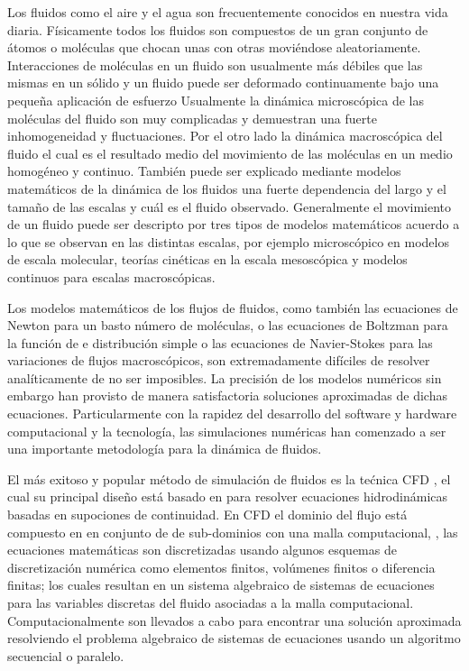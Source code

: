 Los fluidos como el aire y el agua son frecuentemente conocidos en nuestra vida diaria. Físicamente todos los fluidos son compuestos de un gran conjunto de átomos o moléculas que chocan unas con otras moviéndose  aleatoriamente.
Interacciones de moléculas en un fluido son usualmente más débiles que las mismas en un sólido y un fluido puede ser deformado continuamente bajo una pequeña aplicación de esfuerzo
Usualmente la dinámica microscópica de las moléculas del fluido son muy complicadas y demuestran una fuerte inhomogeneidad y fluctuaciones.
Por el otro lado la dinámica macroscópica del fluido el cual es el resultado medio del movimiento de las moléculas en un medio homogéneo y continuo.
También puede ser explicado mediante modelos matemáticos de la dinámica de los fluidos una fuerte dependencia del largo y el tamaño de las escalas y cuál es el fluido observado.
Generalmente el movimiento de un fluido puede ser descripto por tres tipos de modelos matemáticos acuerdo a lo que se observan en las distintas escalas, por ejemplo microscópico en modelos de escala molecular, teorías cinéticas en la escala mesoscópica y modelos continuos para escalas macroscópicas.

Los modelos matemáticos de los flujos de fluidos, como también las ecuaciones de Newton para un basto número de moléculas, o las ecuaciones de Boltzman para la función de e distribución simple o las ecuaciones de Navier-Stokes para las variaciones de flujos macroscópicos, son extremadamente difíciles de resolver analíticamente de no ser imposibles.
La precisión de los modelos numéricos sin embargo han provisto de manera satisfactoria soluciones aproximadas de dichas ecuaciones.
Particularmente con la rapidez del desarrollo del software y hardware computacional y la tecnología, las simulaciones numéricas han comenzado a ser una importante metodología para la dinámica de fluidos.


El más exitoso y popular método de simulación de fluidos es la tećnica CFD , el cual su principal diseño está basado en  para resolver ecuaciones hidrodinámicas basadas en supociones de continuidad.
En CFD el dominio del flujo está compuesto en en conjunto de de sub-dominios con una malla computacional, , las ecuaciones matemáticas son discretizadas usando algunos esquemas de discretización numérica como elementos finitos, volúmenes finitos o diferencia finitas; los cuales resultan en un sistema algebraico de sistemas de ecuaciones para las variables discretas del fluido asociadas a la malla computacional. 
Computacionalmente son llevados a cabo para encontrar una solución aproximada resolviendo el problema algebraico de sistemas de ecuaciones usando un algoritmo secuencial o paralelo.
 
